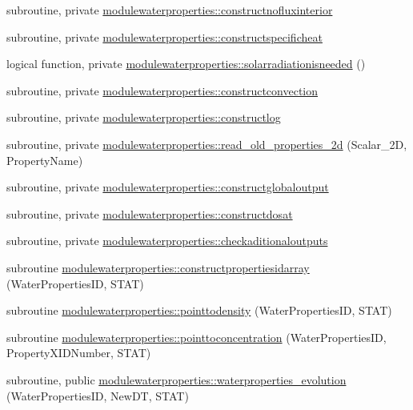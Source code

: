 \begin{DoxyCompactItemize}
subroutine, private \mbox{\hyperlink{namespacemodulewaterproperties_a1cee571ebf44f0252603c9bd29a100e1}{modulewaterproperties\+::constructnofluxinterior}}
\item 
subroutine, private \mbox{\hyperlink{namespacemodulewaterproperties_a638275f2c0c184e858bd3e3e3e459901}{modulewaterproperties\+::constructspecificheat}}
\item 
logical function, private \mbox{\hyperlink{namespacemodulewaterproperties_a53711f4b1de0dd2fa6207fc580193db9}{modulewaterproperties\+::solarradiationisneeded}} ()
\item 
subroutine, private \mbox{\hyperlink{namespacemodulewaterproperties_ad8de5e881e7e755e1d5eaa908ad599eb}{modulewaterproperties\+::constructconvection}}
\item 
subroutine, private \mbox{\hyperlink{namespacemodulewaterproperties_a9f3f90ee5c2e83e1b90c3d1260a0d307}{modulewaterproperties\+::constructlog}}
\item 
subroutine, private \mbox{\hyperlink{namespacemodulewaterproperties_a5a69094fb0cfdb28de4d2307ceeb3f84}{modulewaterproperties\+::read\+\_\+old\+\_\+properties\+\_\+2d}} (Scalar\+\_\+2D, Property\+Name)
\item 
subroutine, private \mbox{\hyperlink{namespacemodulewaterproperties_aef6113e740cce05ecfdab1fee63873df}{modulewaterproperties\+::constructglobaloutput}}
\item 
subroutine, private \mbox{\hyperlink{namespacemodulewaterproperties_ad828152e0a7f6fd60ca0cd045955a56b}{modulewaterproperties\+::constructdosat}}
\item 
subroutine, private \mbox{\hyperlink{namespacemodulewaterproperties_aa08d6c50fcab3e8816fe7775bd101952}{modulewaterproperties\+::checkaditionaloutputs}}
\item 
subroutine \mbox{\hyperlink{namespacemodulewaterproperties_aa292f8dd2fd9a4ac03ea1234db030644}{modulewaterproperties\+::constructpropertiesidarray}} (Water\+Properties\+ID, S\+T\+AT)
\item 
subroutine \mbox{\hyperlink{namespacemodulewaterproperties_a4585c55e4791aa9e486553e2e0ad3c5c}{modulewaterproperties\+::pointtodensity}} (Water\+Properties\+ID, S\+T\+AT)
\item 
subroutine \mbox{\hyperlink{namespacemodulewaterproperties_a4a3c2baf1d479b6f25201db3550c7a46}{modulewaterproperties\+::pointtoconcentration}} (Water\+Properties\+ID, Property\+X\+I\+D\+Number, S\+T\+AT)
\item 
subroutine, public \mbox{\hyperlink{namespacemodulewaterproperties_aa86f63313e6563018f6b05938306a23d}{modulewaterproperties\+::waterproperties\+\_\+evolution}} (Water\+Properties\+ID, New\+DT, S\+T\+AT)

\end{DoxyCompactItemize}
